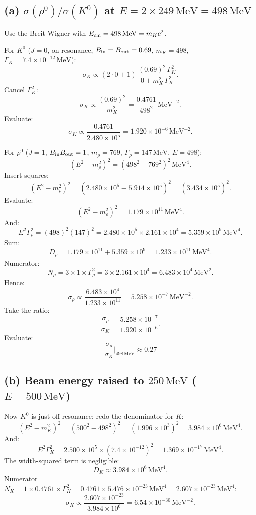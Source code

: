 \documentclass[11pt]{article}
\newcommand{\MeV}{\,\mathrm{MeV}}
\begin{document}
\subsection*{(a) $\sigma(\rho^0)/\sigma(K^0)$ at $E=2\times 249\MeV = 498\MeV$}

Use the Breit-Wigner with $E_{\rm cm}=498\MeV = m_K c^2$.

For $K^0$ ($J=0$, on resonance, $B_{\rm in}=B_{\rm out}=0.69$, $m_K=498$, $\Gamma_K=7.4\times 10^{-12}\MeV$):
\[
\sigma_K \propto (2\cdot 0+1)\,\frac{(0.69)^2\,\Gamma_K^2}{0 + m_K^2\,\Gamma_K^2}.
\]
Cancel $\Gamma_K^2$:
\[
\sigma_K \propto \frac{(0.69)^2}{m_K^2} = \frac{0.4761}{498^2}\MeV^{-2}.
\]
Evaluate:
\[
\sigma_K \propto \frac{0.4761}{2.480\times 10^5} = 1.920\times 10^{-6}\MeV^{-2}.
\]

For $\rho^0$ ($J=1$, $B_{\rm in}B_{\rm out}=1$, $m_\rho=769$, $\Gamma_\rho=147\MeV$, $E=498$):
\[
(E^2 - m_\rho^2)^2 = (498^2 - 769^2)^2\MeV^4.
\]
Insert squares:
\[
(E^2 - m_\rho^2)^2 = (2.480\times 10^5 - 5.914\times 10^5)^2 = (3.434\times 10^5)^2.
\]
Evaluate:
\[
(E^2 - m_\rho^2)^2 = 1.179\times 10^{11}\MeV^4.
\]
And:
\[
E^2\Gamma_\rho^2 = (498)^2(147)^2 = 2.480\times 10^5 \times 2.161\times 10^4 = 5.359\times 10^{9}\MeV^4.
\]
Sum:
\[
D_\rho = 1.179\times 10^{11} + 5.359\times 10^9 = 1.233\times 10^{11}\MeV^4.
\]
Numerator:
\[
N_\rho = 3 \times 1 \times \Gamma_\rho^2 = 3 \times 2.161\times 10^4 = 6.483\times 10^4\MeV^2.
\]
Hence:
\[
\sigma_\rho \propto \frac{6.483\times 10^4}{1.233\times 10^{11}} = 5.258\times 10^{-7}\MeV^{-2}.
\]
Take the ratio:
\[
\frac{\sigma_\rho}{\sigma_K} = \frac{5.258\times 10^{-7}}{1.920\times 10^{-6}}.
\]
Evaluate:
\[
\boxed{\;\frac{\sigma_\rho}{\sigma_K}\bigg|_{498\MeV} \approx 0.27\;}
\]

\subsection*{(b) Beam energy raised to $250\MeV$ ($E=500\MeV$)}

Now $K^0$ is just off resonance; redo the denominator for $K$:
\[
(E^2-m_K^2)^2 = (500^2 - 498^2)^2 = (1.996\times 10^3)^2 = 3.984\times 10^{6}\MeV^4.
\]
And:
\[
E^2\Gamma_K^2 = 2.500\times 10^5 \times (7.4\times 10^{-12})^2 = 1.369\times 10^{-17}\MeV^4.
\]
The width-squared term is negligible:
\[
D_K \approx 3.984\times 10^{6}\MeV^4.
\]
Numerator $N_K = 1\times 0.4761 \times \Gamma_K^2 = 0.4761\times 5.476\times 10^{-23}\MeV^4 = 2.607\times 10^{-23}\MeV^4$:
\[
\sigma_K \propto \frac{2.607\times 10^{-23}}{3.984\times 10^{6}} = 6.54\times 10^{-30}\MeV^{-2}.
\]
\end{document}
